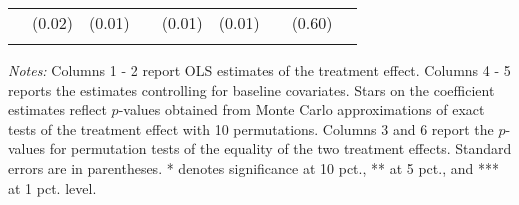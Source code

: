 \begin{table}[h]
{\begin{threeparttable}
\begin{tabular}{l*{8}{c}}
          &   (0.02)&   (0.01)&         &   (0.01)&   (0.01)&         &   (0.60)&         \\
          &         &         &         &         &         &         &         &         \\
\bottomrule \end{tabular} \begin{tablenotes}[flushleft] \footnotesize \item \emph{Notes:} Columns 1 - 2 report OLS estimates of the treatment effect. Columns 4 - 5 reports the estimates controlling for baseline covariates. Stars on the coefficient estimates reflect \(p\)-values obtained from Monte Carlo approximations of exact tests of the treatment effect with 10 permutations. Columns 3 and 6 report the \(p\)-values for permutation tests of the equality of the two treatment effects. Standard errors are in parentheses. * denotes significance at 10 pct., ** at 5 pct., and *** at 1 pct. level. \end{tablenotes} \end{threeparttable} } \end{table}

